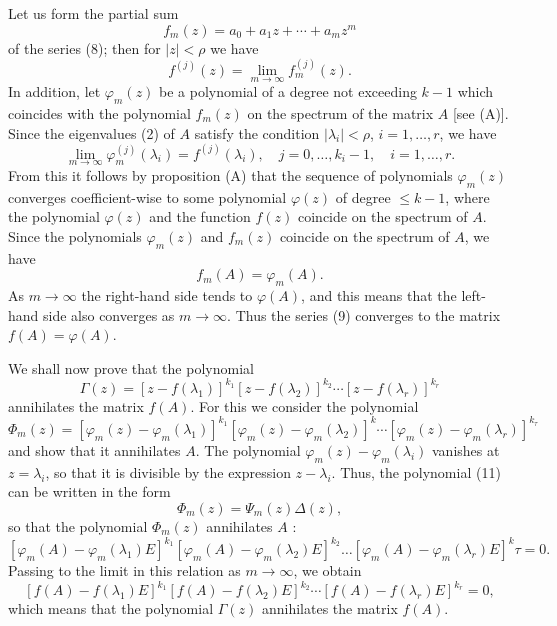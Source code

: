\documentclass[10pt,a5paper]{book}
\makeatletter
\theoremstyle{plain}
\theoremstyle{definition}
\theoremstyle{remark}
\renewenvironment{proof}[1][\proofname]{\par
  \pushQED{\qed}%
  \normalfont\topsep6\p@\@plus6\p@\relax
  \trivlist
  \item\relax{\itshape #1\@addpunct{.}}\hspace\labelsep\ignorespaces
}{\popQED\endtrivlist\@endpefalse}
\makeatother
\begin{document}
\begin{proof}
Let us form the partial sum
\[
f_{m}(z)=a_{0}+a_{1} z+\cdots+a_{m} z^{m}
\]
of the series (8); then for $|z|<\rho$ we have
\[
f^{(j)}(z)=\lim _{m \rightarrow \infty} f_{m}^{(j)}(z) .
\]
In addition, let $\varphi_{m}(z)$ be a polynomial of a degree not exceeding $k-1$ which coincides with the polynomial $f_{m}(z)$ on the spectrum of the matrix $A$ [see (A)]. Since the eigenvalues (2) of $A$ satisfy the condition $\left|\lambda_{i}\right|<\rho$, $i=1, \ldots, r$, we have
\[
\lim _{m \rightarrow \infty} \varphi_{m}^{(j)}\left(\lambda_{i}\right)=f^{(j)}\left(\lambda_{i}\right), \quad j=0, \ldots, k_{i}-1, \quad i=1, \ldots, r .
\]
From this it follows by proposition (A) that the sequence of polynomials $\varphi_{m}(z)$ converges coefficient-wise to some polynomial $\varphi(z)$ of degree $\leq k-1$, where the polynomial $\varphi(z)$ and the function $f(z)$ coincide on the spectrum of $A$. Since the polynomials $\varphi_{m}(z)$ and $f_{m}(z)$ coincide on the spectrum of $A$, we have
\[
f_{m}(A)=\varphi_{m}(A) .
\]
As $m \rightarrow \infty$ the right-hand side tends to $\varphi(A)$, and this means that the left-hand side also converges as $m \rightarrow \infty$. Thus the series (9) converges to the matrix $f(A)=\varphi(A)$.

We shall now prove that the polynomial
\[
\Gamma(z)=\left[z-f\left(\lambda_{1}\right)\right]^{k_{1}}\left[z-f\left(\lambda_{2}\right)\right]^{k_{2}} \cdots\left[z-f\left(\lambda_{r}\right)\right]^{k_{r}}
\]
annihilates the matrix $f(A)$. For this we consider the polynomial
\begin{equation*}
\Phi_{m}(z)=\left[\varphi_{m}(z)-\varphi_{m}\left(\lambda_{1}\right)\right]^{k_{1}}\left[\varphi_{m}(z)-\varphi_{m}\left(\lambda_{2}\right)\right]^{k} \cdots\left[\varphi_{m}(z)-\varphi_{m}\left(\lambda_{r}\right)\right]^{k_{\tau}} \tag{11}
\end{equation*}
and show that it annihilates $A$. The polynomial $\varphi_{m}(z)-\varphi_{m}\left(\lambda_{i}\right)$ vanishes at $z=\lambda_{i}$, so that it is divisible by the expression $z-\lambda_{i}$. Thus, the polynomial (11) can be written in the form
\[
\Phi_{m}(z)=\Psi_{m}(z) \Delta(z),
\]
so that the polynomial $\Phi_{m}(z)$ annihilates $A$ :
\[
\left[\varphi_{m}(A)-\varphi_{m}\left(\lambda_{1}\right) E\right]^{k_{1}}\left[\varphi_{m}(A)-\varphi_{m}\left(\lambda_{2}\right) E\right]^{k_{2}} \ldots\left[\varphi_{m}(A)-\varphi_{m}\left(\lambda_{r}\right) E\right]^{k} \tau=0 .
\]
Passing to the limit in this relation as $m \rightarrow \infty$, we obtain
\[
\left[f(A)-f\left(\lambda_{1}\right) E\right]^{k_{1}}\left[f(A)-f\left(\lambda_{2}\right) E\right]^{k_{2}} \cdots\left[f(A)-f\left(\lambda_{r}\right) E\right]^{k_{r}}=0,
\]
which means that the polynomial $\Gamma(z)$ annihilates the matrix $f(A)$.


\end{proof}
\end{document}
